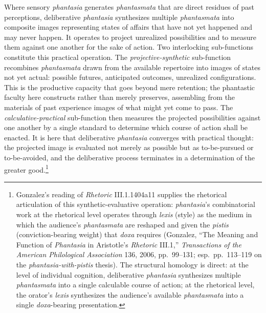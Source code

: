 \documentclass{article}
\begin{document}
Where sensory \textit{phantasia} generates \textit{phantasmata} that are direct residues of past perceptions, deliberative \textit{phantasia} synthesizes multiple \textit{phantasmata} into composite images representing states of affairs that have not yet happened and may never happen. It operates to project unrealized possibilities and to measure them against one another for the sake of action. Two interlocking sub-functions constitute this practical operation. The \textit{projective-synthetic} sub-function recombines \textit{phantasmata} drawn from the available repertoire into images of states not yet actual: possible futures, anticipated outcomes, unrealized configurations. This is the productive capacity that goes beyond mere retention; the phantastic faculty here constructs rather than merely preserves, assembling from the materials of past experience images of what might yet come to pass. The \textit{calculative-practical} sub-function then measures the projected possibilities against one another by a single standard to determine which course of action shall be enacted. It is here that deliberative \textit{phantasia} converges with practical thought: the projected image is evaluated not merely as possible but as to-be-pursued or to-be-avoided, and the deliberative process terminates in a determination of the greater good.\footnote{Gonzalez's reading of \textit{Rhetoric} III.1.1404a11 supplies the rhetorical articulation of this synthetic-evaluative operation: \textit{phantasia}'s combinatorial work at the rhetorical level operates through \textit{lexis} (style) as the medium in which the audience's \textit{phantasmata} are reshaped and given the \textit{pistis} (conviction-bearing weight) that \textit{doxa} requires (Gonzalez, ``The Meaning and Function of \textit{Phantasia} in Aristotle's \textit{Rhetoric} III.1,'' \textit{Transactions of the American Philological Association} 136, 2006, pp.~99--131; esp.~pp.~113--119 on the \textit{phantasia-with-pistis} thesis). The structural homology is direct: at the level of individual cognition, deliberative \textit{phantasia} synthesizes multiple \textit{phantasmata} into a single calculable course of action; at the rhetorical level, the orator's \textit{lexis} synthesizes the audience's available \textit{phantasmata} into a single \textit{doxa}-bearing presentation.}
\end{document}
